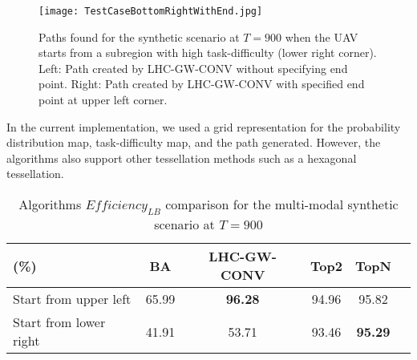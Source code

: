 \begin{figure}
\centering
\texttt{[image: TestCaseBottomRightWithEnd.jpg]}
\caption{Paths found for the synthetic scenario at $T=900$ when the UAV starts from a subregion with high task-difficulty (lower right corner). Left: Path created by LHC-GW-CONV without specifying end point. Right: Path created by LHC-GW-CONV with specified end point at upper left corner.}
\label{SyntheticCasePaths3}
\end{figure}


In the current implementation, we used a grid representation for the probability distribution map, task-difficulty map, and the path generated. However, the algorithms also support other tessellation methods such as a hexagonal tessellation.
\begin{table}
\caption{Algorithms $\mathit{Efficiency_{LB}}$ comparison for the multi-modal synthetic scenario at $T=900$}
	\centering
		\begin{tabular}
			{|l|c|c|c|c|c|}
			\hline
			(\%) & BA & LHC-GW-CONV & Top2 & TopN \\
			\hline
			Start from upper left & 65.99 & \textbf{96.28} & 94.96 & 95.82 \\
			\hline			
			Start from lower right & 41.91 & 53.71 & 93.46 & \textbf{95.29} \\			\hline			
		\end{tabular}
\label{Synthetic}
\end{table}

